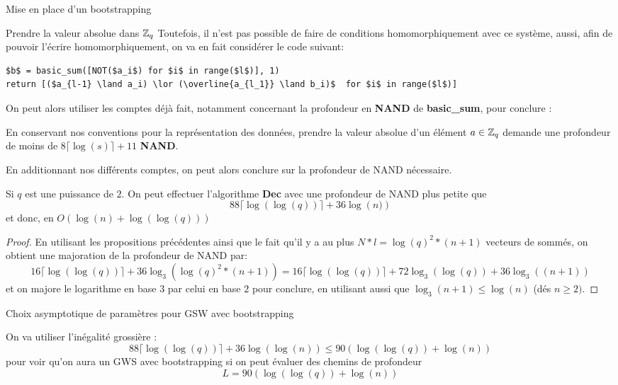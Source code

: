 \begin{section}{Mise en place d'un bootstrapping}
\begin{subsection}{Prendre la valeur absolue dans $\mathbb{Z}_q$}
	Toutefois, il n'est pas possible de faire de conditions homomorphiquement avec ce système, aussi, afin de pouvoir l'écrire homomorphiquement, on va en fait considérer le code suivant:

\vspace{0.5cm}
\begin{lstlisting}
$b$ = basic_sum([NOT($a_i$) for $i$ in range($l$)], 1)
return [($a_{l-1} \land a_i) \lor (\overline{a_{l_1}} \land b_i)$  for $i$ in range($l$)]
\end{lstlisting}

	On peut alors utiliser les comptes déjà fait, notamment concernant la profondeur en \textbf{NAND} de \textbf{basic\_sum}, pour conclure :

\begin{prop}
	En conservant nos conventions pour la représentation des données,
	prendre la valeur absolue d'un élément $a\in \mathbb{Z}_q$ demande une
	profondeur de moins de $8\lceil \log(s) \rceil + 11$ \textbf{NAND}.
\end{prop}
En additionnant nos différents comptes, on peut alors conclure sur la
profondeur de NAND nécessaire.
\begin{thm} \label{size_dec}
	Si $q$ est une puissance de $2$.
	On peut effectuer 
	l'algorithme \textbf{Dec} avec une profondeur de NAND plus petite que
	\[88 \lceil \log(\log(q)) \rceil + 36 \log\left(n)\right) \]
	et donc, en $O(\log(n) + \log(\log(q)))$
\end{thm}
\begin{proof}
En utilisant les propositions précédentes ainsi que le fait qu'il y a au plus $N*l = \log(q)^2 * (n+1)$ vecteurs de
sommés, on obtient une majoration de la profondeur de NAND par:
\[16 \lceil \log(\log(q)) \rceil + 36 \log_3\left(\log(q)^2
*(n+1)\right) = 16 \lceil \log(\log(q)) \rceil + 72 \log_3(\log(q)) + 36 \log_3\left((n+1)\right) \]
et on majore le logarithme en base $3$ par celui en base $2$ pour conclure, en
utilisant aussi que $\log_3(n+1) \leq \log(n)$ (dés $n \geq 2)$.
\end{proof}
\end{subsection}
\begin{subsection}{Choix asymptotique de paramètres pour GSW avec bootstrapping}

On va utiliser l'inégalité grossière :
\[
88 \lceil\log(\log(q))\rceil + 36 \log(\log(n)) \leq 90\left(\log(\log(q)) + \log(n)\right) \]
pour voir qu'on aura un GWS avec bootstrapping si on peut évaluer des chemins
de profondeur
\[ L = 90 \left(\log(\log(q)) + \log(n)\right) \]


\end{subsection}
\end{section}
